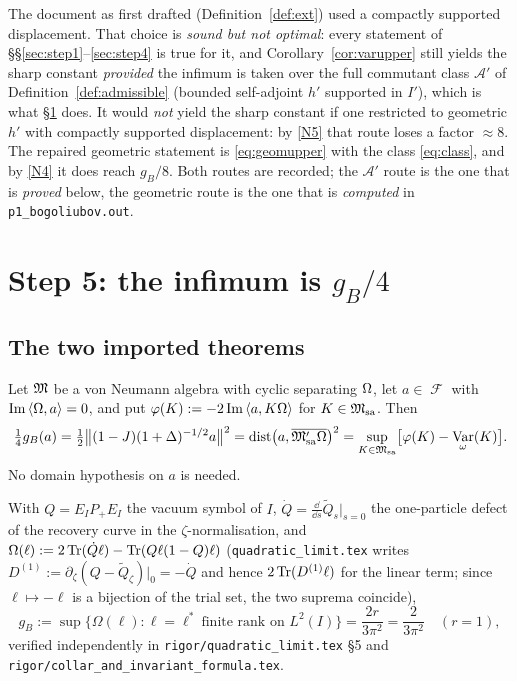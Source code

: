 \documentclass[11pt]{article}
\newcommand{\Pp}{P_+}\newcommand{\Pm}{P_-}
\DeclareMathOperator{\Fock}{\mathcal F}
\newcommand{\ip}[2]{\left\langle #1,#2\right\rangle}\newcommand{\one}{\mathbf 1}
\newcommand{\Msa}{\cM_{\mathrm{sa}}}\newcommand{\Mpsa}{\cM'_{\mathrm{sa}}}
\DeclareMathOperator{\dist}{dist}\DeclareMathOperator{\Var}{Var}\DeclareMathOperator*{\slim}{s\text{-}lim}
\begin{document}
\begin{verdictgap}
The document as first drafted (Definition~\ref{def:ext}) used a compactly supported displacement.
That choice is \emph{sound but not optimal}: every statement of
\S\S\ref{sec:step1}--\ref{sec:step4} is true for it, and Corollary~\ref{cor:varupper} still yields
the sharp constant \emph{provided} the infimum is taken over the full commutant class
$\mathcal A'$ of Definition~\ref{def:admissible} (bounded self-adjoint $h'$ supported in $I'$), which
is what \S\ref{sec:step5} does.  It would \emph{not} yield the sharp constant if one restricted to
geometric $h'$ with compactly supported displacement: by \ref{N5} that route loses a factor
$\approx8$.  The repaired geometric statement is \eqref{eq:geomupper} with the class
\eqref{eq:class}, and by \ref{N4} it does reach $g_B/8$.  Both routes are recorded; the
$\mathcal A'$ route is the one that is \emph{proved} below, the geometric route is the one that is
\emph{computed} in \texttt{p1\_bogoliubov.out}.
\end{verdictgap}

\section{Step 5: the infimum is $g_B/4$}\label{sec:step5}

\subsection{The two imported theorems}
\begin{theorem}\label{thm:three-faces}
Let $\mathfrak M$ be a von Neumann algebra with cyclic separating $\Omega$, let $a\in\Fock$ with
$\operatorname{Im}\ip\Om a=0$, and put $\varphi(K):=-2\operatorname{Im}\ip a{K\Om}$ for $K\in\Msa$.
Then
\[
 \tfrac14g_B(a)=\tfrac12\bigl\|(1-J)(1+\Delta)^{-1/2}a\bigr\|^2
 =\dist\bigl(a,\overline{\Mpsa\Om}\bigr)^2
 =\sup_{K\in\Msa}\bigl[\varphi(K)-\Var_\omega(K)\bigr].
\]
No domain hypothesis on $a$ is needed.
\end{theorem}
\begin{theorem}\label{thm:gBvalue}
With $Q=E_I\Pp E_I$ the vacuum symbol of $I$, $\dot Q=\frac{\dd}{\dd s}\widetilde Q_s|_{s=0}$ the
one-particle defect of the recovery curve in the $\zeta$-normalisation, and
$\Omega(\ell):=2\operatorname{Tr}(\dot Q\ell)-\operatorname{Tr}(Q\ell(1-Q)\ell)$ (\texttt{quadratic\_limit.tex} writes
$D^{(1)}:=\partial_\zeta(Q-\widetilde Q_\zeta)|_0=-\dot Q$ and hence $2\operatorname{Tr}(D^{(1)}\ell)$ for the
linear term; since $\ell\mapsto-\ell$ is a bijection of the trial set, the two suprema coincide),
\[
 g_B:=\sup\{\Omega(\ell):\ell=\ell^*\ \text{finite rank on }L^2(I)\}=\frac{2r}{3\pi^2}=\frac2{3\pi^2}
 \quad(r=1),
\]
verified independently in \texttt{rigor/quadratic\_limit.tex} \S5 and
\texttt{rigor/collar\_and\_invariant\_formula.tex}.
\end{theorem}
\end{document}
